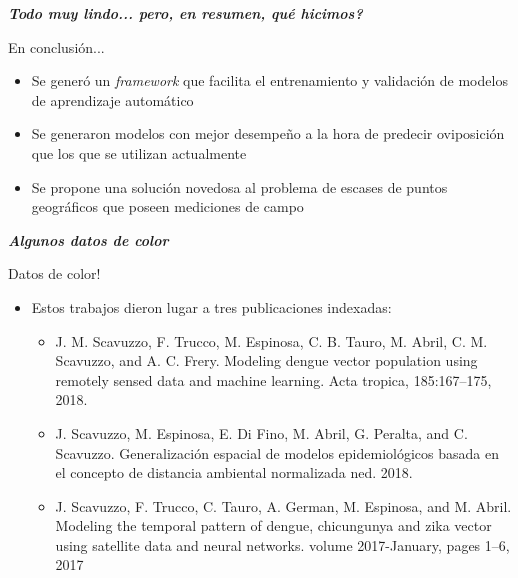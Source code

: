 \documentclass[10pt]{beamer}
\newcommand\IncrFont{\fontsize{20}{20}\selectfont}
\begin{document}
\begin{frame}{}
  \IncrFont
  \begin{center}
    \textit{\textbf{Todo muy lindo... pero, en resumen, qué hicimos?}}
  \end{center}
\end{frame}


\begin{frame}{En conclusión...}
  \begin{itemize}[<+->]
    \item Se generó un \textit{framework} que facilita el entrenamiento y
        validación de modelos de aprendizaje automático
    \item Se generaron modelos con mejor desempeño a la hora de predecir
        oviposición que los que se utilizan actualmente
    \item Se propone una solución novedosa al problema de escases de puntos
        geográficos que poseen mediciones de campo
  \end{itemize}
\end{frame}



\begin{frame}{}
  \IncrFont
  \begin{center}
    \textit{\textbf{Algunos datos de color}}
  \end{center}
\end{frame}


\begin{frame}{Datos de color!}
  \begin{itemize}[<+->]
    \item Estos trabajos dieron lugar a tres publicaciones indexadas:
    \begin{itemize}
      \item J. M. Scavuzzo, F. Trucco, M. Espinosa, C. B. Tauro, M. Abril, C. M. Scavuzzo, and
      A. C. Frery. Modeling dengue vector population using remotely sensed data and machine
      learning. Acta tropica, 185:167–175, 2018.
      \item J. Scavuzzo, M. Espinosa, E. Di Fino, M. Abril, G. Peralta, and C. Scavuzzo.
      Generalización espacial de modelos epidemiológicos basada en el concepto de distancia ambiental
      normalizada ned. 2018.
      \item J. Scavuzzo, F. Trucco, C. Tauro, A. German, M. Espinosa, and M. Abril. Modeling
      the temporal pattern of dengue, chicungunya and zika vector using satellite data and
      neural networks. volume 2017-January, pages 1–6, 2017
    \end{itemize}
  \end{itemize}
\end{frame}
\end{document}
